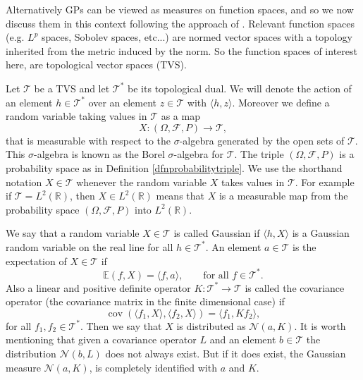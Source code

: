 \documentclass[12pt]{book}
\newcommand{\E}{\mathbb{E}} %
\newcommand{\tvs}{\mathscr{T}} %
\DeclareMathOperator*{\cov}{cov}
\begin{document}
Alternatively GPs can be viewed as  measures on function spaces, and so we now discuss them in this
context following the approach of \cite{lifshits2012lectures}.
Relevant function spaces (e.g. $L^{p}$ spaces, Sobolev spaces, etc...) are 
normed vector spaces with a topology inherited from the metric induced by the norm. So
the function spaces of interest here, are topological vector spaces (TVS). 

Let $\mathscr{T}$ be a TVS and  let $\mathscr{T}^{*}$ be its topological dual. 
We will denote the action of an 
element $h\in\tvs^{*}$ over an element $z\in\tvs$ with $\langle h,z\rangle$. Moreover 
we  define a random variable taking values in $\tvs$ as a map 
\begin{equation*}
X:(\Omega,\mathscr{F},P)\longrightarrow\tvs,
\end{equation*}
that is measurable with respect to the $\sigma$-algebra generated by the open sets
of $\tvs$. This $\sigma$-algebra is known as the Borel $\sigma$-algebra for $\tvs$.
The triple $(\Omega,\mathscr{F},P)$ is a probability space as in Definition \ref{dfnprobabilitytriple}. 
We use the shorthand notation  $X\in\tvs$ whenever the random variable $X$ takes values in $\tvs$. 
For example if $\tvs=L^{2}(\mathbb{R})$,  then  $X\in L^{2}(\mathbb{R})$ means that $X$ is a measurable
map from the probability space $(\Omega,\mathscr{F},P)$ into $L^{2}(\mathbb{R})$.

We say that a random variable $X\in\tvs$ is called Gaussian if $\langle h,X\rangle$ is
a Gaussian random variable on the real line for all $h\in\tvs^{*}$. An element $a\in\tvs$ is the 
expectation of $X\in\tvs$ if 
\begin{equation*}
\E(f,X)=\langle f, a\rangle,\qquad\text{for all }f\in\tvs^{*}.
\end{equation*}
Also a linear and positive definite operator $K:\tvs^{*}\longrightarrow \tvs$ 
is called the covariance operator (the covariance
matrix in the finite dimensional case) if
\begin{equation*}
\cov(\langle f_{1},X\rangle,\langle f_{2},X\rangle)=\langle f_{1},Kf_{2}\rangle,
\end{equation*}
for all $f_{1},f_{2}\in\tvs^{*}$. Then we say that $X$ is distributed as 
$\mathcal{N}(a,K)$. It is worth mentioning
that given a covariance operator $L$ and an element $b\in\tvs$ the distribution $\mathcal{N}(b,L)$
does not always exist\cite{lifshits2013gaussian}. But if it does exist, the  Gaussian measure $\mathcal{N}(a,K)$, is completely
identified with $a$ and $K$.
\newline
\end{document}
